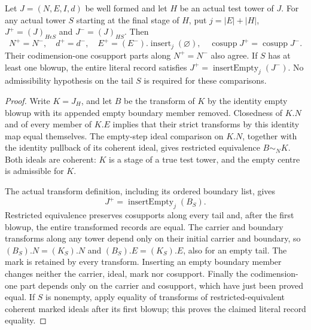 \begin{lemma}
\label{hir:original-interior-empty-geometric-dictionary}
\leanok
{}
Let $J=(N,E,I,d)$ be well formed and let $H$ be an actual test tower of $J$.
For any actual tower $S$ starting at the final stage of $H$, put
$j=|E|+|H|$, $J^+=(J)_{H\epsilon S}$ and $J^-=(J)_{HS}$.
Then
\[
 N^+=N^-,\quad d^+=d^-,\quad E^+=(E^-).\operatorname{insert}_j(\varnothing),
 \quad\operatorname{cosupp}J^+=\operatorname{cosupp}J^-.
\]
Their codimension-one cosupport parts along $N^+=N^-$ also agree.
If $S$ has at least one blowup, the entire literal record satisfies
$J^+=\operatorname{insertEmpty}_j(J^-)$.
No admissibility hypothesis on the tail $S$ is required for these comparisons.
\end{lemma}
\begin{proof}
Write $K=J_H$, and let $B$ be the transform of $K$ by the identity empty
blowup with its appended empty boundary member removed.  Closedness of $K.N$
and of every member of $K.E$ implies that their strict transforms by this
identity map equal themselves.  The empty-step ideal comparison on $K.N$,
together with the identity pullback of its coherent ideal, gives restricted
equivalence $B\sim_N K$.  Both ideals are coherent: $K$ is a stage of a true
test tower, and the empty centre is admissible for $K$.

The actual transform definition, including its ordered boundary list, gives
\[
J^+=\operatorname{insertEmpty}_j(B_S).
\]
Restricted equivalence preserves cosupports along every tail and, after the
first blowup, the entire transformed records are equal.  The carrier and
boundary transforms along any tower depend only on their initial carrier and
boundary, so $(B_S).N=(K_S).N$ and $(B_S).E=(K_S).E$, also for an empty tail.
The mark is retained by every transform.  Inserting an empty boundary member
changes neither the carrier, ideal, mark nor cosupport.  Finally the
codimension-one part depends only on the carrier and cosupport, which have
just been proved equal.  If $S$ is nonempty, apply equality of transforms of
restricted-equivalent coherent marked ideals after its first blowup; this
proves the claimed literal record equality.
\end{proof}

